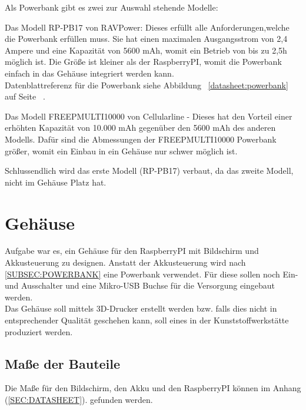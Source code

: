 \documentclass[12pt,a4paper]{article}
\begin{document}
Als Powerbank gibt es zwei zur Auswahl stehende Modelle:
\begin{itemize}
	\item{Das Modell RP-PB17 von RAVPower: Dieses erfüllt alle Anforderungen,welche die Powerbank erfüllen muss. Sie hat einen maximalen Ausgangsstrom von 2,4 Ampere und eine Kapazität von 5600 mAh, womit ein Betrieb von bis zu 2,5h möglich ist. Die Größe ist kleiner als der RaspberryPI, womit die Powerbank einfach in das Gehäuse integriert werden kann. \\
Datenblattreferenz für die Powerbank siehe Abbildung ~\ref{datasheet:powerbank} auf Seite ~\pageref{datasheet:powerbank}.
	\item{Das Modell FREEPMULTI10000 von Cellularline - Dieses hat den Vorteil einer erhöhten Kapazität von 10.000 mAh gegenüber den 5600 mAh des anderen Modells. Dafür sind die Abmessungen der FREEPMULTI10000 Powerbank größer, womit ein Einbau in ein Gehäuse nur schwer möglich ist.}
}
\end{itemize}
Schlussendlich wird das erste Modell (RP-PB17) verbaut, da das zweite Modell, nicht im Gehäuse Platz hat.

\clearpage\vfill\newpage{}
\section{Gehäuse}
\label{SEC:case}

Aufgabe war es, ein Gehäuse für den RaspberryPI mit Bildschirm und Akkusteuerung zu designen. Anstatt der Akkusteuerung wird nach \ref{SUBSEC:POWERBANK} eine Powerbank verwendet. Für diese sollen noch Ein- und Ausschalter und eine Mikro-USB Buchse für die Versorgung eingebaut werden. \\
Das Gehäuse soll mittels 3D-Drucker erstellt werden bzw. falls dies nicht in entsprechender Qualität geschehen kann, soll eines in der Kunststoffwerkstätte produziert werden.\\

\subsection{Maße der Bauteile}

Die Maße für den Bildschirm, den Akku und den RaspberryPI können im Anhang  (\ref{SEC:DATASHEET}).
gefunden werden.
\end{document}
